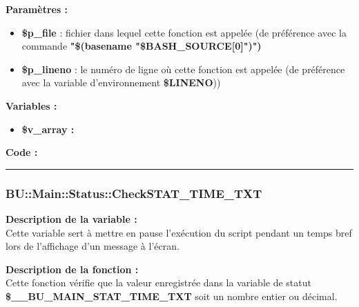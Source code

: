 \documentclass[a4paper,10pt]{article}
\begin{document}
\begin{justify}
    \textbf{Paramètres :}

    \begin{itemize}
        \item \color{orange}\textbf{\$p\_file}\color{white} : fichier dans lequel cette fonction est appelée (de préférence avec la commande \textbf{"\$(\color{gray}basename \color{white}"\color{orange}\$BASH\_SOURCE[0]\color{white}")")}\\

        \item \color{orange}\textbf{\$p\_lineno}\color{white} : le numéro de ligne où cette fonction est appelée (de préférence avec la variable d'environnement \textbf{\color{orange}\$LINENO}))
    \end{itemize}
\end{justify}

\begin{justify}
    \textbf{Variables :}

    \begin{itemize}
        \item \textbf{\color{orange}\$v\_array\color{white} :}
    \end{itemize}
\end{justify}

\begin{justify}
    \textbf{Code :}
\end{justify}



\color{blue}\par\noindent\rule{\textwidth}{0.4pt}\color{white}

\color{blue}
\subsubsection{\color{mauve}BU::Main::Status::CheckSTAT\_TIME\_TXT}\color{white}

\begin{justify}
    \textbf{Description de la variable :}\\
    Cette variable sert à mettre en pause l'exécution du script pendant un temps bref lors de l'affichage d'un message à l'écran.
\end{justify}

\begin{justify}
    \textbf{Description de la fonction :}\\
    Cette fonction vérifie que la valeur enregistrée dans la variable de statut \textbf{\color{orange}\$\_\_BU\_MAIN\_STAT\_TIME\_TXT} soit un nombre entier ou décimal.
\end{justify}
\end{document}
